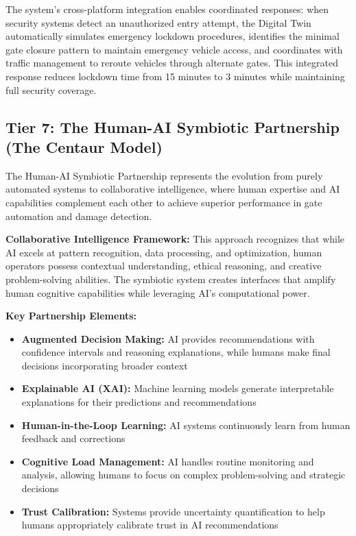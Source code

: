 \documentclass{article}
\begin{document}
The system's cross-platform integration enables coordinated responses: when security systems detect an unauthorized entry attempt, the Digital Twin automatically simulates emergency lockdown procedures, identifies the minimal gate closure pattern to maintain emergency vehicle access, and coordinates with traffic management to reroute vehicles through alternate gates. This integrated response reduces lockdown time from 15 minutes to 3 minutes while maintaining full security coverage.

\subsection{Tier 7: The Human-AI Symbiotic Partnership (The Centaur Model)}

The Human-AI Symbiotic Partnership represents the evolution from purely automated systems to collaborative intelligence, where human expertise and AI capabilities complement each other to achieve superior performance in gate automation and damage detection.

\textbf{Collaborative Intelligence Framework:}
This approach recognizes that while AI excels at pattern recognition, data processing, and optimization, human operators possess contextual understanding, ethical reasoning, and creative problem-solving abilities. The symbiotic system creates interfaces that amplify human cognitive capabilities while leveraging AI's computational power.

\textbf{Key Partnership Elements:}
\begin{itemize}
\item \textbf{Augmented Decision Making:} AI provides recommendations with confidence intervals and reasoning explanations, while humans make final decisions incorporating broader context
\item \textbf{Explainable AI (XAI):} Machine learning models generate interpretable explanations for their predictions and recommendations
\item \textbf{Human-in-the-Loop Learning:} AI systems continuously learn from human feedback and corrections
\item \textbf{Cognitive Load Management:} AI handles routine monitoring and analysis, allowing humans to focus on complex problem-solving and strategic decisions
\item \textbf{Trust Calibration:} Systems provide uncertainty quantification to help humans appropriately calibrate trust in AI recommendations
\end{itemize}
\end{document}
